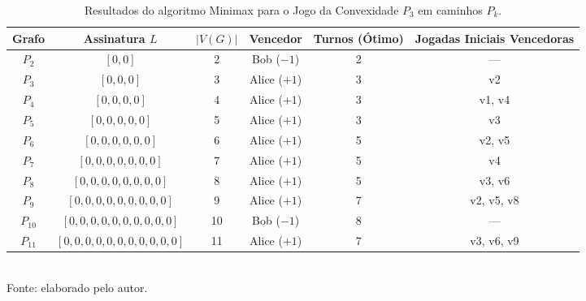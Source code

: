 
\begin{table}[htb]
\centering
\caption{Resultados do algoritmo Minimax para o Jogo da Convexidade $P_3$ em caminhos $P_k$.}
\label{tab:resultados_caminhos}
\begin{tabular}{cccccc}
\toprule
\textbf{Grafo} & \textbf{Assinatura $L$} & $|V(G)|$ & \textbf{Vencedor} & \textbf{Turnos (Ótimo)} & \textbf{Jogadas Iniciais Vencedoras} \\
\midrule
$P_{2}$ & $[0, 0]$ & 2 & Bob ($-1$) & 2 & --- \\
$P_{3}$ & $[0, 0, 0]$ & 3 & Alice ($+1$) & 3 & v2 \\
$P_{4}$ & $[0, 0, 0, 0]$ & 4 & Alice ($+1$) & 3 & v1, v4 \\
$P_{5}$ & $[0, 0, 0, 0, 0]$ & 5 & Alice ($+1$) & 3 & v3 \\
$P_{6}$ & $[0, 0, 0, 0, 0, 0]$ & 6 & Alice ($+1$) & 5 & v2, v5 \\
$P_{7}$ & $[0, 0, 0, 0, 0, 0, 0]$ & 7 & Alice ($+1$) & 5 & v4 \\
$P_{8}$ & $[0, 0, 0, 0, 0, 0, 0, 0]$ & 8 & Alice ($+1$) & 5 & v3, v6 \\
$P_{9}$ & $[0, 0, 0, 0, 0, 0, 0, 0, 0]$ & 9 & Alice ($+1$) & 7 & v2, v5, v8 \\
$P_{10}$ & $[0, 0, 0, 0, 0, 0, 0, 0, 0, 0]$ & 10 & Bob ($-1$) & 8 & --- \\
$P_{11}$ & $[0, 0, 0, 0, 0, 0, 0, 0, 0, 0, 0]$ & 11 & Alice ($+1$) & 7 & v3, v6, v9 \\
\bottomrule
\end{tabular}
\\ \footnotesize{Fonte: elaborado pelo autor.}
\end{table}

